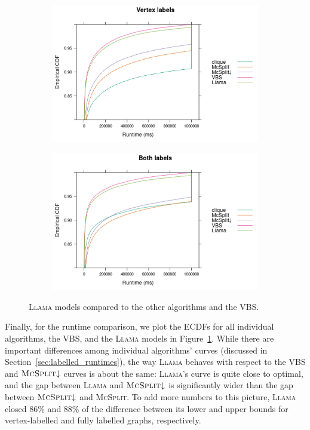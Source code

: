 \documentclass{l4proj}
\theoremstyle{definition}
\theoremstyle{remark}
\begin{document}
\begin{figure}
  \centering
  \begin{subfigure}[t]{0.49\textwidth}
    \centering
    \includegraphics[width=\textwidth]{images/ecdf_vertex_labels_llama.png}
  \end{subfigure}
  \begin{subfigure}[t]{0.49\textwidth}
    \centering
    \includegraphics[width=\textwidth]{images/ecdf_both_labels_llama.png}
  \end{subfigure}
  \caption{\textsc{Llama} models compared to the other algorithms and the VBS.}
  \label{fig:ecdf_llama}
\end{figure}

Finally, for the runtime comparison, we plot the ECDFs for all individual
algorithms, the VBS, and the \textsc{Llama} models in
Figure~\ref{fig:ecdf_llama}. While there are important differences among
individual algorithms' curves (discussed in
Section~\ref{sec:labelled_runtimes}), the way \textsc{Llama} behaves with
respect to the VBS and $\textsc{McSplit}{\downarrow}$ curves is about the same:
\textsc{Llama}'s curve is quite close to optimal, and the gap between
\textsc{Llama} and $\textsc{McSplit}{\downarrow}$ is significantly wider than
the gap between $\textsc{McSplit}{\downarrow}$ and \textsc{McSplit}. To add more
numbers to this picture, \textsc{Llama} closed 86\% and 88\% of the difference
between its lower and upper bounds for vertex-labelled and fully labelled
graphs, respectively.
\end{document}
